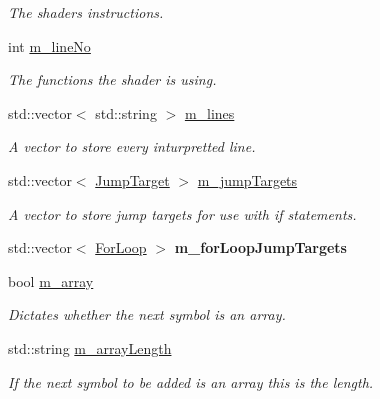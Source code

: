 \begin{DoxyCompactItemize}
\begin{DoxyCompactList}\small\item\em The shaders instructions. \end{DoxyCompactList}\item 
int \hyperlink{class_oso_reader_a2573c4b6a21a1db045eba041ed52b321}{m\-\_\-line\-No}
\begin{DoxyCompactList}\small\item\em The functions the shader is using. \end{DoxyCompactList}\item 
\hypertarget{class_oso_reader_ab53a0d7b47c56c15f2921963e9081d72}{std\-::vector$<$ std\-::string $>$ \hyperlink{class_oso_reader_ab53a0d7b47c56c15f2921963e9081d72}{m\-\_\-lines}}\label{class_oso_reader_ab53a0d7b47c56c15f2921963e9081d72}

\begin{DoxyCompactList}\small\item\em A vector to store every inturpretted line. \end{DoxyCompactList}\item 
\hypertarget{class_oso_reader_a5fdfc7b8e24eea194e7d8984ed74dfa9}{std\-::vector$<$ \hyperlink{struct_jump_target}{Jump\-Target} $>$ \hyperlink{class_oso_reader_a5fdfc7b8e24eea194e7d8984ed74dfa9}{m\-\_\-jump\-Targets}}\label{class_oso_reader_a5fdfc7b8e24eea194e7d8984ed74dfa9}

\begin{DoxyCompactList}\small\item\em A vector to store jump targets for use with if statements. \end{DoxyCompactList}\item 
\hypertarget{class_oso_reader_a9f6a42a31794ddb721b864469134f98b}{std\-::vector$<$ \hyperlink{struct_for_loop}{For\-Loop} $>$ {\bfseries m\-\_\-for\-Loop\-Jump\-Targets}}\label{class_oso_reader_a9f6a42a31794ddb721b864469134f98b}

\item 
\hypertarget{class_oso_reader_a94f869890826ca70d5c0ecaaaea16f20}{bool \hyperlink{class_oso_reader_a94f869890826ca70d5c0ecaaaea16f20}{m\-\_\-array}}\label{class_oso_reader_a94f869890826ca70d5c0ecaaaea16f20}

\begin{DoxyCompactList}\small\item\em Dictates whether the next symbol is an array. \end{DoxyCompactList}\item 
\hypertarget{class_oso_reader_a22c9cd4eb9b56bfe50d1200d0f4379fc}{std\-::string \hyperlink{class_oso_reader_a22c9cd4eb9b56bfe50d1200d0f4379fc}{m\-\_\-array\-Length}}\label{class_oso_reader_a22c9cd4eb9b56bfe50d1200d0f4379fc}

\begin{DoxyCompactList}\small\item\em If the next symbol to be added is an array this is the length. \end{DoxyCompactList}\end{DoxyCompactItemize}
